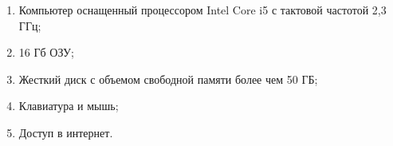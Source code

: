\begin{enumerate}
        \item Компьютер оснащенный процессором Intel Core i5 с тактовой частотой 2,3 ГГц;
        \item 16 Гб ОЗУ;
        \item Жесткий диск с объемом свободной памяти более чем 50 ГБ;
        \item Клавиатура и мышь;
        \item Доступ в интернет.
\end{enumerate}